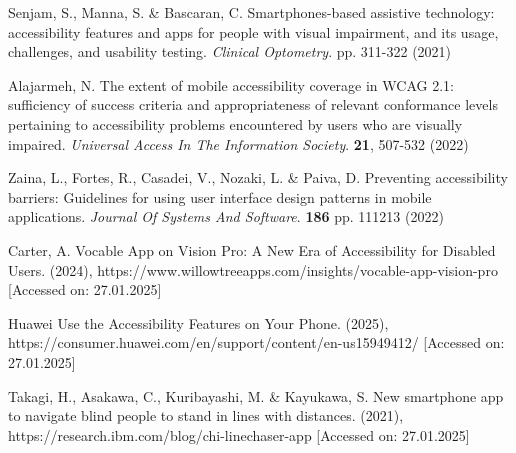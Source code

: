 \documentclass[preprint,12pt,number]{elsarticle}
\begin{document}
\begin{thebibliography}{00}
Senjam, S., Manna, S. \& Bascaran, C. Smartphones-based assistive technology: accessibility features and apps for people with visual impairment, and its usage, challenges, and usability testing. {\em Clinical Optometry}. pp. 311-322 (2021)

Alajarmeh, N. The extent of mobile accessibility coverage in WCAG 2.1: sufficiency of success criteria and appropriateness of relevant conformance levels pertaining to accessibility problems encountered by users who are visually impaired. {\em Universal Access In The Information Society}. \textbf{21}, 507-532 (2022)

Zaina, L., Fortes, R., Casadei, V., Nozaki, L. \& Paiva, D. Preventing accessibility barriers: Guidelines for using user interface design patterns in mobile applications. {\em Journal Of Systems And Software}. \textbf{186} pp. 111213 (2022)

Carter, A. Vocable App on Vision Pro: A New Era of Accessibility for Disabled Users.  (2024), https://www.willowtreeapps.com/insights/vocable-app-vision-pro [Accessed on: 27.01.2025]

Huawei Use the Accessibility Features on Your Phone.  (2025), https://consumer.huawei.com/en/support/content/en-us15949412/ [Accessed on: 27.01.2025]

Takagi, H., Asakawa, C., Kuribayashi, M. \& Kayukawa, S. New smartphone app to navigate blind people to stand in lines with distances.  (2021), https://research.ibm.com/blog/chi-linechaser-app [Accessed on: 27.01.2025]
\end{thebibliography}
\end{document}
